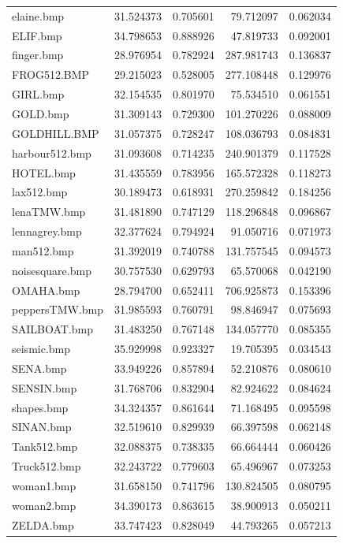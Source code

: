 \documentclass{article}
\begin{document}
\begin{table}[!ht]
\begin{tabular}{@{}lrrrr@{}}
    elaine.bmp         & 31.524373     & 0.705601 & 79.712097  & 0.062034 \\
    ELIF.bmp           & 34.798653     & 0.888926 & 47.819733  & 0.092001 \\
    finger.bmp         & 28.976954     & 0.782924 & 287.981743 & 0.136837 \\
    FROG512.BMP        & 29.215023     & 0.528005 & 277.108448 & 0.129976 \\
    GIRL.bmp           & 32.154535     & 0.801970 & 75.534510  & 0.061551 \\
    GOLD.bmp           & 31.309143     & 0.729300 & 101.270226 & 0.088009 \\
    GOLDHILL.BMP       & 31.057375     & 0.728247 & 108.036793 & 0.084831 \\
    harbour512.bmp     & 31.093608     & 0.714235 & 240.901379 & 0.117528 \\
    HOTEL.bmp          & 31.435559     & 0.783956 & 165.572328 & 0.118273 \\
    lax512.bmp         & 30.189473     & 0.618931 & 270.259842 & 0.184256 \\
    lenaTMW.bmp        & 31.481890     & 0.747129 & 118.296848 & 0.096867 \\
    lennagrey.bmp      & 32.377624     & 0.794924 & 91.050716  & 0.071973 \\
    man512.bmp         & 31.392019     & 0.740788 & 131.757545 & 0.094573 \\
    noisesquare.bmp    & 30.757530     & 0.629793 & 65.570068  & 0.042190 \\
    OMAHA.bmp          & 28.794700     & 0.652411 & 706.925873 & 0.153396 \\
    peppersTMW.bmp     & 31.985593     & 0.760791 & 98.846947  & 0.075693 \\
    SAILBOAT.bmp       & 31.483250     & 0.767148 & 134.057770 & 0.085355 \\
    seismic.bmp        & 35.929998     & 0.923327 & 19.705395  & 0.034543 \\
    SENA.bmp           & 33.949226     & 0.857894 & 52.210876  & 0.080610 \\
    SENSIN.bmp         & 31.768706     & 0.832904 & 82.924622  & 0.084624 \\
    shapes.bmp         & 34.324357     & 0.861644 & 71.168495  & 0.095598 \\
    SINAN.bmp          & 32.519610     & 0.829939 & 66.397598  & 0.062148 \\
    Tank512.bmp        & 32.088375     & 0.738335 & 66.664444  & 0.060426 \\
    Truck512.bmp       & 32.243722     & 0.779603 & 65.496967  & 0.073253 \\
    woman1.bmp         & 31.658150     & 0.741796 & 130.824505 & 0.080795 \\
    woman2.bmp         & 34.390173     & 0.863615 & 38.900913  & 0.050211 \\
    ZELDA.bmp          & 33.747423     & 0.828049 & 44.793265  & 0.057213 \\
    \bottomrule
  \end{tabular}
\end{table}
\end{document}
